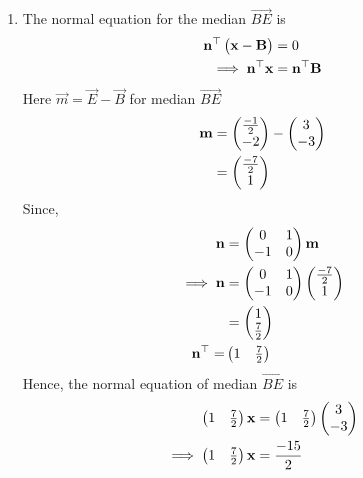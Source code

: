 \documentclass[10pt]{book}
\begin{document}
\begin{enumerate}[label=\thesection.\arabic*.,ref=\thesection.\theenumi]
\begin{enumerate}
\item The normal equation for the median $\vec{BE}$ is
\begin{align}
\mathbf{n}^{\top}\begin{pmatrix}\mathbf{x}-\mathbf{B}\end{pmatrix}&=0\\
\implies
\mathbf{n}^{\top}\mathbf{x}&=\mathbf{n}^{\top}\mathbf{B}
\end{align}
Here $\vec{m} = \vec{E}- \vec{B}$ for median $\vec{BE}$
\begin{align}
\mathbf{m}&=\begin{pmatrix}\frac{-1}{2}\\ -2\end{pmatrix} - \begin{pmatrix}3\\-3\end{pmatrix}\\
       &=\begin{pmatrix}\frac{-7}{2}\\1\end{pmatrix}
\end{align}
Since,
\begin{align}
  \mathbf{n} &= \begin{pmatrix}0 & 1\\
  -1 & 0\end{pmatrix}\mathbf{m}\\
\implies
\mathbf{n} &= \begin{pmatrix}0 & 1\\
  -1 & 0\end{pmatrix}\begin{pmatrix}\frac{-7}{2}\\1\end{pmatrix}\\
        &= \begin{pmatrix}1\\ \frac{7}{2}\end{pmatrix}\\
        \mathbf{n}^{\top} = &\begin{pmatrix}1 & \frac{7}{2}\end{pmatrix}
\end{align}
Hence, the normal equation of median $\vec{BE}$ is 
\begin{align}
    \begin{pmatrix}1 & \frac{7}{2}\end{pmatrix}\mathbf{x}&=\begin{pmatrix}1 & \frac{7}{2}\end{pmatrix}\begin{pmatrix}3\\-3\end{pmatrix}\\
\implies
    \begin{pmatrix}1 & \frac{7}{2}\end{pmatrix}\mathbf{x}&=\frac{-15}{2}
\end{align}


\end{enumerate}
\end{enumerate}
\end{document}
